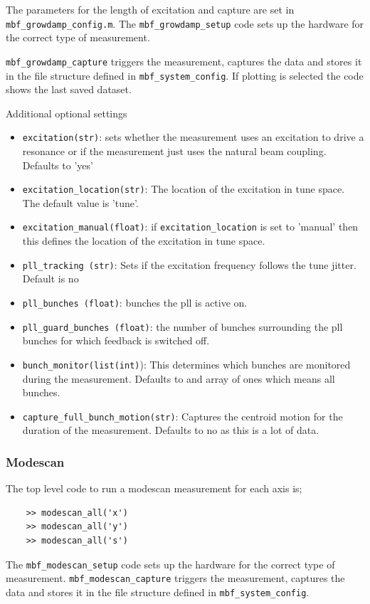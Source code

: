 \documentclass{report}
\begin{document}
The parameters for the length of excitation and  capture are set in \verb|mbf_growdamp_config.m|.
 The \verb|mbf_growdamp_setup| code sets up the hardware for the correct type of measurement. 
 
 \verb|mbf_growdamp_capture| triggers the measurement, captures the data and stores it in the file structure defined in \verb|mbf_system_config|. If plotting is selected the code shows the last saved dataset.
 
Additional optional settings
\begin{itemize}
\item \verb|excitation(str)|: sets whether the measurement uses an excitation to drive a resonance or if the measurement just uses the natural beam coupling. Defaults to 'yes'
\item \verb|excitation_location(str)|: The location of the excitation in tune space. The default value is 'tune'.
\item \verb|excitation_manual(float)|: if \verb|excitation_location| is set to 'manual' then this defines the location of the excitation in tune space.
\item \verb|pll_tracking (str)|: Sets if the excitation frequency follows the tune jitter. Default is no
\item \verb|pll_bunches (float)|: bunches the pll is active on.
\item \verb|pll_guard_bunches (float)|: the number of bunches surrounding the pll bunches for which feedback is switched off.
\item \verb|bunch_monitor(list(int)|): This determines which bunches are monitored during the measurement. Defaults to and array of ones which means all bunches.
\item \verb|capture_full_bunch_motion(str)|: Captures the centroid motion for the duration of the measurement. Defaults to no as this is a lot of data. 
\end{itemize}
\subsubsection{Modescan}
The top level code to run a modescan measurement for each axis is; 
\begin{verbatim}
    >> modescan_all('x') 
    >> modescan_all('y') 
    >> modescan_all('s') 
\end{verbatim}

The \verb|mbf_modescan_setup| code sets up the hardware for the correct type of measurement. \verb|mbf_modescan_capture| triggers the measurement, captures the data and stores it in the file structure defined in \verb|mbf_system_config|. 
\end{document}
